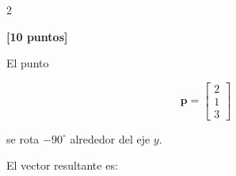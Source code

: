 \documentclass[10pt]{article}
\begin{document}
\begin{multicols}{2}
        \begin{question}
            \textbf{[10 puntos]}

            El punto

            \[
            \mathbf{p}
            =
            \begin{bmatrix}
                2\\
                1\\
                3
            \end{bmatrix}
            \]

            se rota \(-90^\circ\) alrededor del eje \(y\).

            El vector resultante es:

            \begin{inlineanswers}



            \end{inlineanswers}
        \end{question}




\end{multicols}
\end{document}
